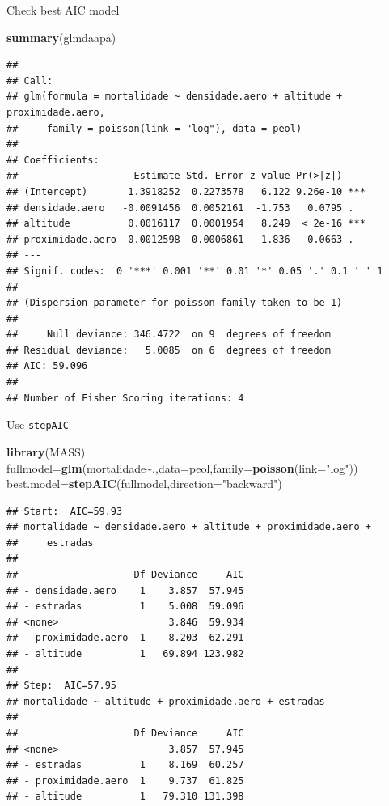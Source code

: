 \documentclass[
]{book}
\newenvironment{Shaded}{\begin{snugshade}}{\end{snugshade}}
\newcommand{\AttributeTok}[1]{\textcolor[rgb]{0.13,0.29,0.53}{#1}}
\newcommand{\FunctionTok}[1]{\textcolor[rgb]{0.13,0.29,0.53}{\textbf{#1}}}
\newcommand{\NormalTok}[1]{#1}
\newcommand{\OtherTok}[1]{\textcolor[rgb]{0.56,0.35,0.01}{#1}}
\newcommand{\SpecialCharTok}[1]{\textcolor[rgb]{0.81,0.36,0.00}{\textbf{#1}}}
\newcommand{\StringTok}[1]{\textcolor[rgb]{0.31,0.60,0.02}{#1}}
\begin{document}
Check best AIC model

\begin{Shaded}
\begin{Highlighting}[]
\FunctionTok{summary}\NormalTok{(glmdaapa)}
\end{Highlighting}
\end{Shaded}

\begin{verbatim}
## 
## Call:
## glm(formula = mortalidade ~ densidade.aero + altitude + proximidade.aero, 
##     family = poisson(link = "log"), data = peol)
## 
## Coefficients:
##                    Estimate Std. Error z value Pr(>|z|)    
## (Intercept)       1.3918252  0.2273578   6.122 9.26e-10 ***
## densidade.aero   -0.0091456  0.0052161  -1.753   0.0795 .  
## altitude          0.0016117  0.0001954   8.249  < 2e-16 ***
## proximidade.aero  0.0012598  0.0006861   1.836   0.0663 .  
## ---
## Signif. codes:  0 '***' 0.001 '**' 0.01 '*' 0.05 '.' 0.1 ' ' 1
## 
## (Dispersion parameter for poisson family taken to be 1)
## 
##     Null deviance: 346.4722  on 9  degrees of freedom
## Residual deviance:   5.0085  on 6  degrees of freedom
## AIC: 59.096
## 
## Number of Fisher Scoring iterations: 4
\end{verbatim}

Use \texttt{stepAIC}

\begin{Shaded}
\begin{Highlighting}[]
\FunctionTok{library}\NormalTok{(MASS)}
\NormalTok{fullmodel}\OtherTok{=}\FunctionTok{glm}\NormalTok{(mortalidade}\SpecialCharTok{\textasciitilde{}}\NormalTok{.,}\AttributeTok{data=}\NormalTok{peol,}\AttributeTok{family=}\FunctionTok{poisson}\NormalTok{(}\AttributeTok{link=}\StringTok{"log"}\NormalTok{))}
\NormalTok{best.model}\OtherTok{=}\FunctionTok{stepAIC}\NormalTok{(fullmodel,}\AttributeTok{direction=}\StringTok{"backward"}\NormalTok{)}
\end{Highlighting}
\end{Shaded}

\begin{verbatim}
## Start:  AIC=59.93
## mortalidade ~ densidade.aero + altitude + proximidade.aero + 
##     estradas
## 
##                    Df Deviance     AIC
## - densidade.aero    1    3.857  57.945
## - estradas          1    5.008  59.096
## <none>                   3.846  59.934
## - proximidade.aero  1    8.203  62.291
## - altitude          1   69.894 123.982
## 
## Step:  AIC=57.95
## mortalidade ~ altitude + proximidade.aero + estradas
## 
##                    Df Deviance     AIC
## <none>                   3.857  57.945
## - estradas          1    8.169  60.257
## - proximidade.aero  1    9.737  61.825
## - altitude          1   79.310 131.398
\end{verbatim}
\end{document}
